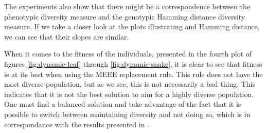 
The experiments also show that there might be a correspondence between the phenotypic \dia{} diversity measure and the genotypic Hamming distance diversity measure. If we take a closer look at the plots illustrating \dia{} and Hamming distance, we can see that their slopes are similar. %

When it comes to the fitness of the individuals, presented in the fourth plot of figures \ref{fig:dynamic-leaf} through \ref{fig:dynamic-snake}, it is clear to see that fitness is at its best when using the MEEE replacement rule. This rule does not have the most diverse population, but as we see, this is not necessarily a bad thing. This indicates that it is not the best solution to aim for a highly diverse population. One must find a balanced solution and take advantage of the fact that it is possible to switch between maintaining diversity and not doing so, which is in correspondance with the results presented in \cite{Darwen00doesextra}.
